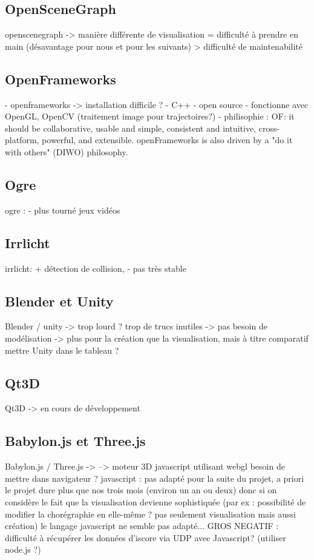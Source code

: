 \subsection{OpenSceneGraph}
openscenegraph -> manière différente de visualisation = difficulté à prendre en main (désavantage pour nous et pour les suivants) > difficulté de maintenabilité

\subsection{OpenFrameworks}
- openframeworks -> installation difficile ?
- C++
- open source
- fonctionne avec OpenGL, OpenCV (traitement image pour trajectoires?)
- philisophie : 
OF:  it should be collaborative, usable and simple, consistent and intuitive, cross-platform, powerful, and extensible. openFrameworks is also driven by a "do it with others" (DIWO) philosophy. 

\subsection{Ogre}
ogre : - plus tourné jeux vidéos 

\subsection{Irrlicht}
irrlicht: + détection de collision, - pas très stable 



\subsection{Blender et Unity}

Blender / unity -> trop lourd ? trop de trucs inutiles 
				-> pas besoin de modélisation
				-> plus pour la création que la visualisation, mais à titre comparatif mettre Unity dans le tableau ?\\

\subsection{Qt3D}
Qt3D -> en cours de développement

\subsection{Babylon.js et Three.js}

Babylon.js / Three.js -> --> moteur 3D javascript utilisant webgl
		besoin de mettre dans navigateur  ? 
	javascript : pas adapté pour la suite du projet, a priori le projet dure plus que nos trois mois (environ un an ou deux) donc si on considère le fait que la visualisation devienne sophistiquée (par ex : possibilité de modifier la chorégraphie en elle-même ? pas seulement visualisation mais aussi création) le langage javascript ne semble pas adapté...
		GROS NEGATIF : difficulté à récupérer les données d'iscore via UDP avec Javascript? (utiliser node.js ?)